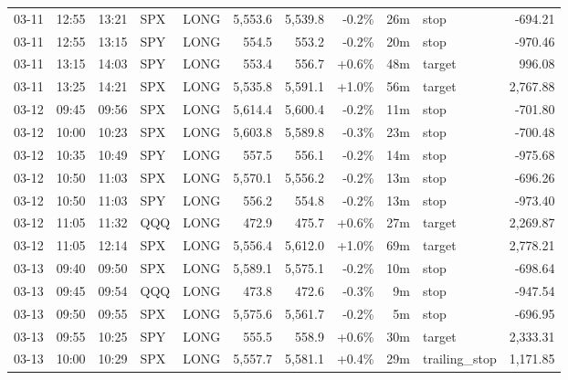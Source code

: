 \documentclass[11pt,a4paper,twoside]{article}
\begin{document}
\begin{center}
\begin{longtable}{>{\color{txtmain}}l l l l l r r r r >{\color{txtmain}}l r}
03-11 & 12:55 & 13:21 & SPX & LONG & 5,553.6 & 5,539.8 & \textcolor{lossred}{-0.2\%} & 26m & stop & \textcolor{lossred}{-694.21} \\
03-11 & 12:55 & 13:15 & SPY & LONG & 554.5 & 553.2 & \textcolor{lossred}{-0.2\%} & 20m & stop & \textcolor{lossred}{-970.46} \\
03-11 & 13:15 & 14:03 & SPY & LONG & 553.4 & 556.7 & \textcolor{wingreen}{+0.6\%} & 48m & target & \textcolor{wingreen}{996.08} \\
03-11 & 13:25 & 14:21 & SPX & LONG & 5,535.8 & 5,591.1 & \textcolor{wingreen}{+1.0\%} & 56m & target & \textcolor{wingreen}{2,767.88} \\
03-12 & 09:45 & 09:56 & SPX & LONG & 5,614.4 & 5,600.4 & \textcolor{lossred}{-0.2\%} & 11m & stop & \textcolor{lossred}{-701.80} \\
03-12 & 10:00 & 10:23 & SPX & LONG & 5,603.8 & 5,589.8 & \textcolor{lossred}{-0.3\%} & 23m & stop & \textcolor{lossred}{-700.48} \\
03-12 & 10:35 & 10:49 & SPY & LONG & 557.5 & 556.1 & \textcolor{lossred}{-0.2\%} & 14m & stop & \textcolor{lossred}{-975.68} \\
03-12 & 10:50 & 11:03 & SPX & LONG & 5,570.1 & 5,556.2 & \textcolor{lossred}{-0.2\%} & 13m & stop & \textcolor{lossred}{-696.26} \\
03-12 & 10:50 & 11:03 & SPY & LONG & 556.2 & 554.8 & \textcolor{lossred}{-0.2\%} & 13m & stop & \textcolor{lossred}{-973.40} \\
03-12 & 11:05 & 11:32 & QQQ & LONG & 472.9 & 475.7 & \textcolor{wingreen}{+0.6\%} & 27m & target & \textcolor{wingreen}{2,269.87} \\
03-12 & 11:05 & 12:14 & SPX & LONG & 5,556.4 & 5,612.0 & \textcolor{wingreen}{+1.0\%} & 69m & target & \textcolor{wingreen}{2,778.21} \\
03-13 & 09:40 & 09:50 & SPX & LONG & 5,589.1 & 5,575.1 & \textcolor{lossred}{-0.2\%} & 10m & stop & \textcolor{lossred}{-698.64} \\
03-13 & 09:45 & 09:54 & QQQ & LONG & 473.8 & 472.6 & \textcolor{lossred}{-0.3\%} & 9m & stop & \textcolor{lossred}{-947.54} \\
03-13 & 09:50 & 09:55 & SPX & LONG & 5,575.6 & 5,561.7 & \textcolor{lossred}{-0.2\%} & 5m & stop & \textcolor{lossred}{-696.95} \\
03-13 & 09:55 & 10:25 & SPY & LONG & 555.5 & 558.9 & \textcolor{wingreen}{+0.6\%} & 30m & target & \textcolor{wingreen}{2,333.31} \\
03-13 & 10:00 & 10:29 & SPX & LONG & 5,557.7 & 5,581.1 & \textcolor{wingreen}{+0.4\%} & 29m & trailing\_stop & \textcolor{wingreen}{1,171.85} \\

\end{longtable}
\end{center}
\end{document}
